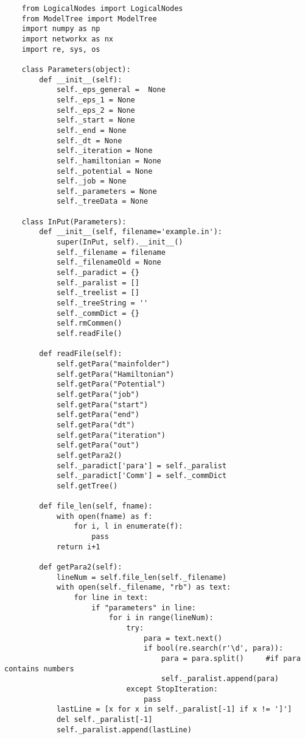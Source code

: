 \begin{verbatim}
    from LogicalNodes import LogicalNodes
    from ModelTree import ModelTree
    import numpy as np
    import networkx as nx
    import re, sys, os
    
    class Parameters(object):
        def __init__(self):
            self._eps_general =  None
            self._eps_1 = None
            self._eps_2 = None
            self._start = None
            self._end = None
            self._dt = None
            self._iteration = None
            self._hamiltonian = None
            self._potential = None
            self._job = None
            self._parameters = None
            self._treeData = None
    
    class InPut(Parameters):
        def __init__(self, filename='example.in'):
            super(InPut, self).__init__()
            self._filename = filename
            self._filenameOld = None
            self._paradict = {}
            self._paralist = []
            self._treelist = []
            self._treeString = ''
            self._commDict = {}
            self.rmCommen()
            self.readFile()
    
        def readFile(self):
            self.getPara("mainfolder")
            self.getPara("Hamiltonian")
            self.getPara("Potential")
            self.getPara("job")
            self.getPara("start")
            self.getPara("end")
            self.getPara("dt")
            self.getPara("iteration")
            self.getPara("out")
            self.getPara2()
            self._paradict['para'] = self._paralist
            self._paradict['Comm'] = self._commDict
            self.getTree()
    
        def file_len(self, fname):
            with open(fname) as f:
                for i, l in enumerate(f):
                    pass
            return i+1
    
        def getPara2(self):
            lineNum = self.file_len(self._filename)
            with open(self._filename, "rb") as text:
                for line in text:
                    if "parameters" in line:
                        for i in range(lineNum):
                            try:
                                para = text.next()
                                if bool(re.search(r'\d', para)):
                                    para = para.split()     #if para contains numbers
                                    self._paralist.append(para)
                            except StopIteration:
                                pass
            lastLine = [x for x in self._paralist[-1] if x != ']']
            del self._paralist[-1]
            self._paralist.append(lastLine)
    

\end{verbatim}
